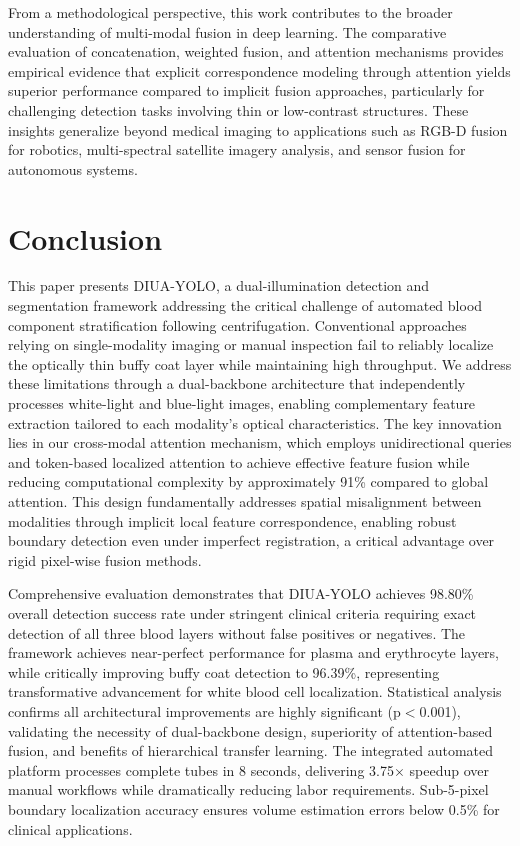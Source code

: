 \documentclass[journal,twoside,web]{ieeecolor}
\begin{document}
From a methodological perspective, this work contributes to the broader understanding of multi-modal fusion in deep learning. The comparative evaluation of concatenation, weighted fusion, and attention mechanisms provides empirical evidence that explicit correspondence modeling through attention yields superior performance compared to implicit fusion approaches, particularly for challenging detection tasks involving thin or low-contrast structures. These insights generalize beyond medical imaging to applications such as RGB-D fusion for robotics, multi-spectral satellite imagery analysis, and sensor fusion for autonomous systems.


\section{Conclusion}
\label{sec:conclusion}
This paper presents DIUA-YOLO, a dual-illumination detection and segmentation framework addressing the critical challenge of automated blood component stratification following centrifugation. Conventional approaches relying on single-modality imaging or manual inspection fail to reliably localize the optically thin buffy coat layer while maintaining high throughput. We address these limitations through a dual-backbone architecture that independently processes white-light and blue-light images, enabling complementary feature extraction tailored to each modality's optical characteristics. The key innovation lies in our cross-modal attention mechanism, which employs unidirectional queries and token-based localized attention to achieve effective feature fusion while reducing computational complexity by approximately 91\% compared to global attention. This design fundamentally addresses spatial misalignment between modalities through implicit local feature correspondence, enabling robust boundary detection even under imperfect registration, a critical advantage over rigid pixel-wise fusion methods.

Comprehensive evaluation demonstrates that DIUA-YOLO achieves 98.80\% overall detection success rate under stringent clinical criteria requiring exact detection of all three blood layers without false positives or negatives. The framework achieves near-perfect performance for plasma and erythrocyte layers, while critically improving buffy coat detection to 96.39\%, representing transformative advancement for white blood cell localization. Statistical analysis confirms all architectural improvements are highly significant (p$<$0.001), validating the necessity of dual-backbone design, superiority of attention-based fusion, and benefits of hierarchical transfer learning. The integrated automated platform processes complete tubes in 8 seconds, delivering 3.75$\times$ speedup over manual workflows while dramatically reducing labor requirements. Sub-5-pixel boundary localization accuracy ensures volume estimation errors below 0.5\% for clinical applications.
\end{document}
